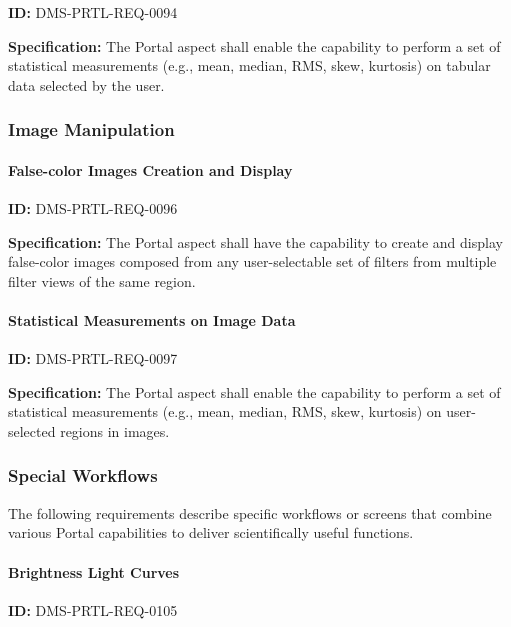 \documentclass[SE,toc,lsstdraft]{lsstdoc}
\begin{document}
\label{DMS-PRTL-REQ-0094}
\textbf{ID:} DMS-PRTL-REQ-0094

\textbf{Specification:}
The Portal aspect shall enable the capability to perform a set of statistical measurements (e.g., mean, median, RMS, skew, kurtosis) on tabular data selected by the user.

\subsubsection{Image Manipulation}

\paragraph{False-color Images Creation and Display}\hfill  %

\label{DMS-PRTL-REQ-0096}
\textbf{ID:} DMS-PRTL-REQ-0096

\textbf{Specification:}
The Portal aspect shall have the capability to create and display false-color images composed from any user-selectable set of filters from multiple filter views of the same region.

\paragraph{Statistical Measurements on Image Data}\hfill  %

\label{DMS-PRTL-REQ-0097}
\textbf{ID:} DMS-PRTL-REQ-0097

\textbf{Specification:}
The Portal aspect shall enable the capability to perform a set of statistical measurements (e.g., mean, median, RMS, skew, kurtosis) on user-selected regions in images.

\subsubsection{Special Workflows}

The following requirements describe specific workflows or screens that combine various Portal capabilities to deliver scientifically useful functions.

\paragraph{Brightness Light Curves}\hfill  %

\label{DMS-PRTL-REQ-0105}
\textbf{ID:} DMS-PRTL-REQ-0105
\end{document}
